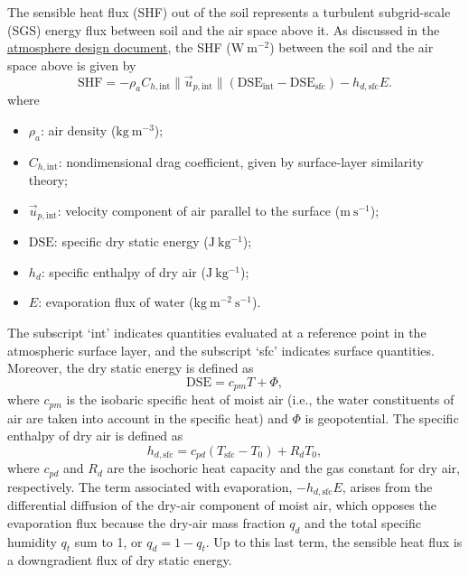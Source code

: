\documentclass[twoside,10pt]{report}
\begin{document}
The sensible heat flux (SHF) out of the soil represents a turbulent subgrid-scale (SGS) energy flux between soil and the air space above it. As discussed in the \href{https://github.com/climate-machine/Design-Docs/blob/master/CLIMA-atmos/}{atmosphere design document}, the SHF ($\mathrm{W~m^{-2}}$) between the soil and the air space above is given by 
\begin{equation}\label{e:sfc_SHF}
       \mathrm{SHF} = 
    -\rho_a C_{h, \mathrm{int}} \| \vec{u}_{p, \mathrm{int}} \|
    ( \mathrm{DSE}_\mathrm{int} - \mathrm{DSE}_\mathrm{sfc} )
    - h_{d,\mathrm{sfc}} E.
\end{equation}
where 
\begin{itemize}
    \item $\rho_a$: air density ($\mathrm{kg~m^{-3}}$);
    \item $C_{h, \mathrm{int}}$: nondimensional drag coefficient, given by surface-layer similarity theory;
    \item $\vec{u}_{p, \mathrm{int}}$: velocity component of air parallel to the surface ($\mathrm{m~s^{-1}}$);
    \item $\mathrm{DSE}$: specific dry static energy ($\mathrm{J~kg^{-1}}$);
    \item $h_d$: specific enthalpy of dry air ($\mathrm{J~kg^{-1}}$);
    \item $E$: evaporation flux of water ($\mathrm{kg~m^{-2}~s^{-1}}$).
\end{itemize}
The subscript `int' indicates quantities evaluated at a reference point in the atmospheric surface layer, and the subscript `sfc' indicates surface quantities. Moreover, the  dry static energy is defined as
\begin{equation}
\mathrm{DSE} = c_{pm} T + \Phi,
\end{equation}
where $c_{pm}$ is the isobaric specific heat of moist air (i.e., the water constituents of air are taken into account in the specific heat) and $\Phi$ is geopotential. The specific enthalpy of dry air is defined as
\[
h_{d, \mathrm{sfc}} = c_{pd} (T_\mathrm{sfc} - T_0) + R_d T_0,
\]
where $c_{pd}$ and $R_d$ are the isochoric heat capacity and the gas constant for  dry air, respectively.  The term associated with evaporation, $-h_{d,\mathrm{sfc}} E$, arises from the differential diffusion of the dry-air component of moist air, which opposes the evaporation flux because the dry-air mass fraction $q_d$ and the total specific humidity $q_t$ sum to 1, or $q_d = 1-q_t$. Up to this last term, the sensible heat flux is a downgradient flux of dry static energy.
\end{document}
